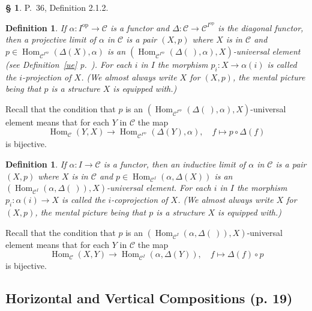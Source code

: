 \documentclass[12pt]{article}%
\newtheorem{df}[thm]{Definition}%
\theoremstyle{remark}
\theoremstyle{definition}
\newtheorem{s}[thm]{\S}%
\newcommand{\C}{\mathcal C}
\DeclareMathOperator{\Hom}{Hom}%
\DeclareMathOperator{\op}{op}
\begin{document}
\begin{s} 
P.~36, Definition 2.1.2. 
%
\begin{df}\label{p}
If $\alpha:I^{\op}\to\C$ is a functor and $\Delta:\C\to\C^{I^{\op}}$ is the diagonal functor, then a {\em projective limit of} $\alpha$ {\em in} $\C$ is a pair $(X,p)$ where $X$ is in $\C$ and $p\in\Hom_{\C^{I^{\op}}}(\Delta(X),\alpha)$ is an $(\Hom_{\C^{I^{\op}}}(\Delta(\ ),\alpha),X)$-universal element (see Definition~\ref{ue} p.~\pageref{ue}). For each $i$ in $I$ the morphism $p_i:X\to\alpha(i)$ is called the $i$-{\em projection} of $X$. (We almost always write $X$ for $(X,p)$, the mental picture being that $p$ is a structure $X$ is equipped with.)
\end{df}
%
Recall that the condition that $p$ is an $(\Hom_{\C^{I^{\op}}}(\Delta(\ ),\alpha),X)$-universal element means that for each $Y$ in $\C$ the map 
$$
\Hom_\C(Y,X)\to\Hom_{\C^{I^{\op}}}(\Delta(Y),\alpha),\quad f\mapsto p\circ\Delta(f)
$$ 
is bijective.
%
\begin{df}\label{c}
If $\alpha:I\to\C$ is a functor, then an {\em inductive limit of} $\alpha$ {\em in} $\C$ is a pair $(X,p)$ where $X$ is in $\C$ and $p\in\Hom_{\C^I}(\alpha,\Delta(X))$ is an $(\Hom_{\C^I}(\alpha,\Delta(\ )),X)$-universal element. For each $i$ in $I$ the morphism $p_i:\alpha(i)\to X$ is called the $i$-{\em coprojection} of $X$. (We almost always write $X$ for $(X,p)$, the mental picture being that $p$ is a structure $X$ is equipped with.)
\end{df}
%
Recall that the condition that $p$ is an $(\Hom_{\C^I}(\alpha,\Delta(\ )),X)$-universal element means that for each $Y$ in $\C$ the map 
\begin{equation}\label{cue}
\Hom_\C(X,Y)\to\Hom_{\C^I}(\alpha,\Delta(Y)),\quad f\mapsto\Delta(f)\circ p
\end{equation}
is bijective.
\end{s}


\subsection{Horizontal and Vertical Compositions (p. 19)}\label{hove1}

\end{document}
